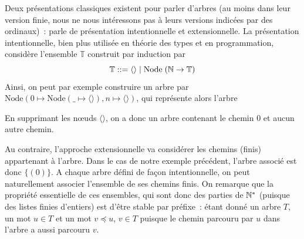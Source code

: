 \documentclass{article}
\begin{document}
Deux présentations classiques existent pour parler d'arbres (au moins dans leur version finie, nous ne nous intéressons pas à leurs versions indicées par des ordinaux)~: \cite{DBLP:journals/corr/abs-2105-08951} parle de présentation intentionnelle et extensionnelle. La présentation intentionnelle, bien plus utilisée en théorie des types et en programmation, considère l'ensemble $\mathbb T$ construit par induction par
\[\mathbb T ::= \langle\rangle \mid \mathrm{Node}\;(\mathbb{N} \to \mathbb T)\]
Ainsi, on peut par exemple construire un arbre par $\mathrm{Node}(0 \mapsto \mathrm{Node}(\_\mapsto \langle\rangle), n \mapsto \langle\rangle)$, qui représente alors l'arbre
\begin{center}
\end{center}

En supprimant les n\oe uds $\langle\rangle$, on a donc un arbre contenant le chemin $0$ et aucun autre chemin.

Au contraire, l'approche extensionnelle va considérer les chemins (finis) appartenant à l'arbre. Dans le cas de notre exemple précédent, l'arbre associé est donc $\{(0)\}$. A chaque arbre défini de façon intentionnelle, on peut naturellement associer l'ensemble de ses chemins finis. On remarque que la propriété essentielle de ces ensembles, qui sont donc des parties de $\mathbb{N}^*$ (puisque des listes finies d'entiers) est d'être stable par préfixe~: étant donné un arbre $T$, un mot $u \in T$ et un mot $v\preceq u$, $v\in T$ puisque le chemin parcouru par $u$ dans l'arbre a aussi parcouru $v$.
\end{document}
